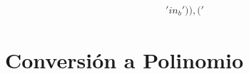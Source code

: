 \documentclass[10pt, a4paper]{article}
\begin{document}
\begin{align*}
'in_b')), ('%
\end{align*}\part{Conversión a Polinomio}
\end{document}
